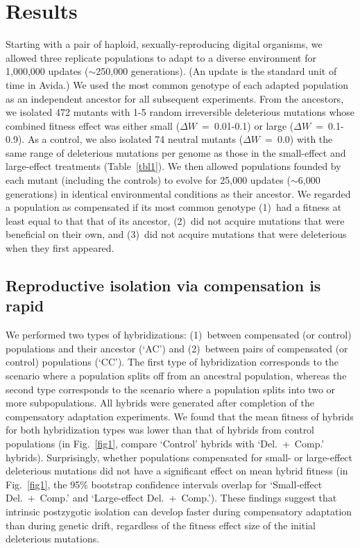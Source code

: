 \documentclass[12pt]{article}
\begin{document}
\section*{Results}

Starting with a pair of haploid, sexually-reproducing digital organisms,
we allowed three replicate populations to adapt to a diverse environment
for 1,000,000 updates ($\sim$250,000 generations).
%
(An update is the standard unit of time in Avida.)
%
We used the most common genotype of each adapted population
as an independent ancestor for all subsequent experiments.
%
From the ancestors, we isolated 472 mutants
with 1-5 random irreversible deleterious mutations
whose combined fitness effect was either
small ($\Delta W$~=~0.01-0.1) or large ($\Delta W$~=~0.1-0.9).
%
As a control, we also isolated 74 neutral mutants ($\Delta W$~=~0.0)
with the same range of deleterious mutations per genome as those
in the small-effect and large-effect treatments (Table~\ref{tbl1}).
%
We then allowed populations founded by each mutant (including the controls)
to evolve for 25,000 updates ($\sim$6,000 generations)
in identical environmental conditions as their ancestor.
%
We regarded a population as compensated if its most common genotype
(1)~had a fitness at least equal to that that of its ancestor,
(2)~did not acquire mutations that were beneficial on their own, and
(3)~did not acquire mutations that were deleterious when they first appeared.



\subsection*{Reproductive isolation via compensation is rapid}

We performed two types of hybridizations:
(1)~between compensated (or control) populations and their ancestor (`AC')
and (2)~between pairs of compensated (or control) populations (`CC').
%
The first type of hybridization corresponds to the scenario where
a population splits off from an ancestral population,
whereas the second type corresponds to the scenario where
a population splits into two or more subpopulations.
%
All hybrids were generated after completion
of the compensatory adaptation experiments.
%
We found that the mean fitness of hybrids for both hybridization types
was lower than that of hybrids from control populations
(in Fig.~\ref{fig1}, compare `Control' hybrids with `Del.~+~Comp.' hybrids).
%
Surprisingly, whether populations compensated for
small- or large-effect deleterious mutations
did not have a significant effect on mean hybrid fitness
(in Fig.~\ref{fig1}, the 95\% bootstrap confidence intervals overlap for
`Small-effect Del.~+~Comp.' and `Large-effect Del.~+~Comp.').
%
These findings suggest that intrinsic postzygotic isolation
can develop faster during compensatory adaptation than during genetic drift,
regardless of the fitness effect size of the initial deleterious mutations.
\end{document}
